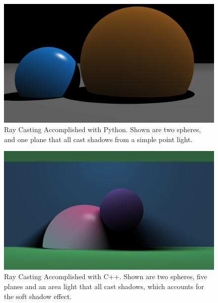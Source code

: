 \begin{figure}[ht]
\centering
\includegraphics[width=\textwidth]{figures/ShadowCastingPython.png}
\caption{Ray Casting Accomplished with Python.  Shown are two spheres, and one plane that all cast shadows from a simple point light. }
\label{fig:pythonraycasting}
\end{figure}

\begin{figure}[ht]
\centering
\includegraphics[width=\textwidth]{figures/ShadowCastingC++.jpeg}
\caption{Ray Casting Accomplished with C++.  Shown are two spheres, five planes and an area light that all cast shadows, which accounts for the soft shadow effect. }
\label{fig:cplusraycasting}
\end{figure}

